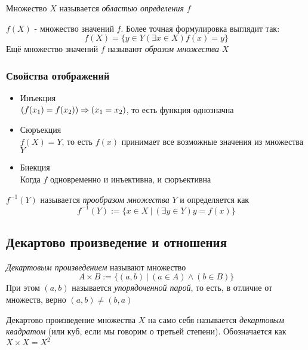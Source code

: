 \begin{definition}
    Множество $X$ называется \textit{областью определения} $f$
\end{definition}

\begin{definition}
    $f(X)$ - множество значений $f$. Более точная формулировка выглядит так:
    $$
    f(X) = \{y \in Y (\exists x \in X) f(x) = y\}
    $$
    Ещё множество значений $f$ называют \textit{образом множества} $X$
\end{definition}


\subsubsection{Свойства отображений}

\begin{itemize}
    \item Инъекция \\
    $(f(x_1) = f(x_2)) \Rightarrow (x_1 = x_2)$, то есть функция однозначна
    \item Сюръекция \\
    $f(X) = Y$, то есть $f(x)$ принимает все возможные значения из множества $Y$
    \item Биекция \\
    Когда $f$ одновременно и инъективна, и сюръективна
\end{itemize}

\begin{definition}
    $f^{-1}(Y)$ называется \textit{прообразом множества} $Y$ и определяется как
    $$
        f^{-1}(Y) := \{x \in X\ |\ (\exists y \in Y) y = f(x)\}
    $$
\end{definition}


\subsection{Декартово произведение и отношения}

\begin{definition}
    \textit{Декартовым произведением} называют множество
    $$
        A \times B := \{(a, b)\ |\ (a \in A) \wedge (b \in B)\}
    $$
    При этом $(a, b)$ называется \textit{упорядоченной парой}, то есть, в отличие от множеств, верно $(a, b) \neq (b, a)$
\end{definition}

\begin{definition}
    Декартово произведение множества $X$ на само себя называется \textit{декартовым квадратом} (или куб, если мы говорим о третьей степени). Обозначается как $X \times X = X^2$
\end{definition}

